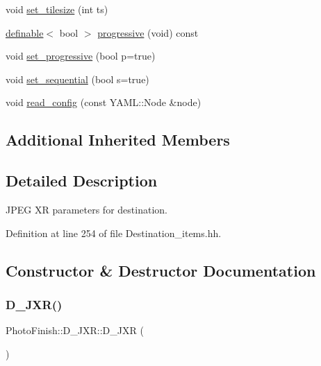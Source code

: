\begin{DoxyCompactItemize}
\item 
void \hyperlink{class_photo_finish_1_1_d___j_x_r_a3c1ee557b8f99e6fa66405edd4acf43c}{set\+\_\+tilesize} (int ts)
\item 
\hyperlink{class_photo_finish_1_1definable}{definable}$<$ bool $>$ \hyperlink{class_photo_finish_1_1_d___j_x_r_a99c043e825ad8bc5d96dfe5b2de083c7}{progressive} (void) const
\item 
void \hyperlink{class_photo_finish_1_1_d___j_x_r_afb06e4ea2fa5a9f98c91780410c9a582}{set\+\_\+progressive} (bool p=true)
\item 
void \hyperlink{class_photo_finish_1_1_d___j_x_r_ac75c9944df3a37f18b9f3696b4d00ae3}{set\+\_\+sequential} (bool s=true)
\item 
void \hyperlink{class_photo_finish_1_1_d___j_x_r_a9cc84f4132005be3f90c6f80c9ccab21}{read\+\_\+config} (const Y\+A\+M\+L\+::\+Node \&node)
\end{DoxyCompactItemize}
\subsection*{Additional Inherited Members}


\subsection{Detailed Description}
J\+P\+EG XR parameters for destination. 

Definition at line 254 of file Destination\+\_\+items.\+hh.



\subsection{Constructor \& Destructor Documentation}
\mbox{\label{class_photo_finish_1_1_d___j_x_r_a7fe3f2922a9f6127d8d217b9cdb7cb45}} 
\subsubsection{\texorpdfstring{D\+\_\+\+J\+X\+R()}{D\_JXR()}}
{\footnotesize\ttfamily Photo\+Finish\+::\+D\+\_\+\+J\+X\+R\+::\+D\+\_\+\+J\+XR (\begin{DoxyParamCaption}{ }\end{DoxyParamCaption})}



